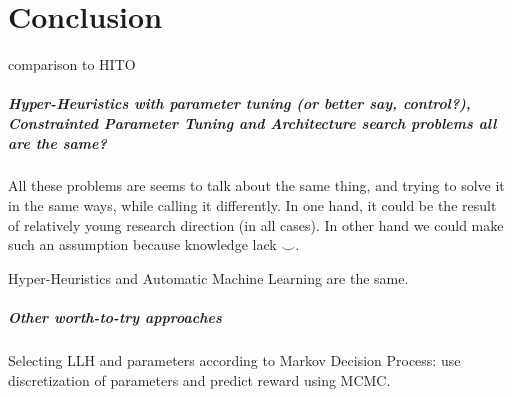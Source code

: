 \chapter{Conclusion}
comparison to HITO~\cite{guizzo2015hyper}


\paragraph{Hyper-Heuristics with parameter tuning (or better say, control?), Constrainted Parameter Tuning and Architecture search problems all are the same?}
All these problems are seems to talk about the same thing, and trying to solve it in the same ways, while calling it differently. In one hand, it could be the result of relatively young research direction (in all cases). In other hand we could make such an assumption because knowledge lack $\smile$.

Hyper-Heuristics and Automatic Machine Learning are the same.

\paragraph{Other worth-to-try approaches}
Selecting LLH and parameters according to Markov Decision Process: use discretization of parameters and predict reward using MCMC.

